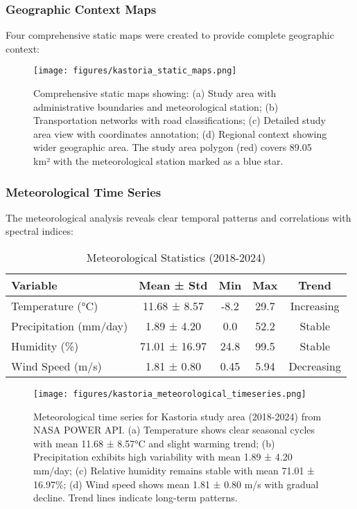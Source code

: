 \documentclass[a4paper,12pt]{article}
\begin{document}
\subsubsection{Geographic Context Maps}

Four comprehensive static maps were created to provide complete geographic
context:

\begin{figure}[H]
    \centering
    \texttt{[image: figures/kastoria\_static\_maps.png]}
    \caption{Comprehensive static maps showing: (a) Study area with administrative boundaries and meteorological station; (b) Transportation networks with road classifications; (c) Detailed study area view with coordinates annotation; (d) Regional context showing wider geographic area. The study area polygon (red) covers 89.05 km² with the meteorological station marked as a blue star.}
    \label{fig:static_maps}
\end{figure}

\subsubsection{Meteorological Time Series}

The meteorological analysis reveals clear temporal patterns and correlations
with spectral indices:

\begin{table}[H]
    \centering
    \caption{Meteorological Statistics (2018-2024)}
    \begin{tabular}{@{}lcccc@{}}
        \toprule
        Variable               & Mean ± Std   & Min  & Max  & Trend      \\
        \midrule
        Temperature (°C)       & 11.68 ± 8.57 & -8.2 & 29.7 & Increasing \\
        Precipitation (mm/day) & 1.89 ± 4.20  & 0.0  & 52.2 & Stable     \\
        Humidity (\%)          & 71.01 ± 16.97& 24.8 & 99.5 & Stable     \\
        Wind Speed (m/s)       & 1.81 ± 0.80  & 0.45 & 5.94 & Decreasing \\
        \bottomrule
    \end{tabular}
\end{table}

\begin{figure}[H]
    \centering
    \texttt{[image: figures/kastoria\_meteorological\_timeseries.png]}
    \caption{Meteorological time series for Kastoria study area (2018-2024) from NASA POWER API. (a) Temperature shows clear seasonal cycles with mean 11.68 ± 8.57°C and slight warming trend; (b) Precipitation exhibits high variability with mean 1.89 ± 4.20 mm/day; (c) Relative humidity remains stable with mean 71.01 ± 16.97\%; (d) Wind speed shows mean 1.81 ± 0.80 m/s with gradual decline. Trend lines indicate long-term patterns.}
    \label{fig:met_timeseries}
\end{figure}
\end{document}
